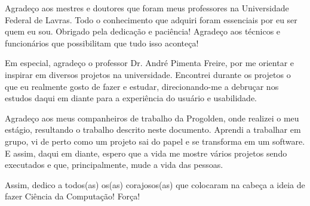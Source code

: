
Agradeço aos mestres e doutores que foram meus professores na Universidade Federal de Lavras. Todo o conhecimento que adquiri foram essenciais por eu ser quem eu sou. Obrigado pela dedicação e paciência! Agradeço aos técnicos e funcionários que possibilitam que tudo isso  aconteça!

Em especial, agradeço o professor Dr. André Pimenta Freire, por me orientar e inspirar em diversos projetos na universidade. Encontrei durante os projetos o que eu realmente gosto de fazer e estudar, direcionando-me a debruçar nos estudos daqui em diante para a experiência do usuário e usabilidade. 

Agradeço aos meus companheiros de trabalho da Progolden, onde realizei o meu estágio, resultando o trabalho descrito neste documento. Aprendi a trabalhar em grupo, vi de perto como um projeto sai do papel e se transforma em um software. E assim, daqui em diante, espero que a vida me mostre vários projetos sendo executados e que, principalmente, mude a vida das pessoas.

Assim, dedico a todos(as) os(as) corajosos(as) que colocaram na cabeça a ideia de fazer Ciência da Computação! Força!